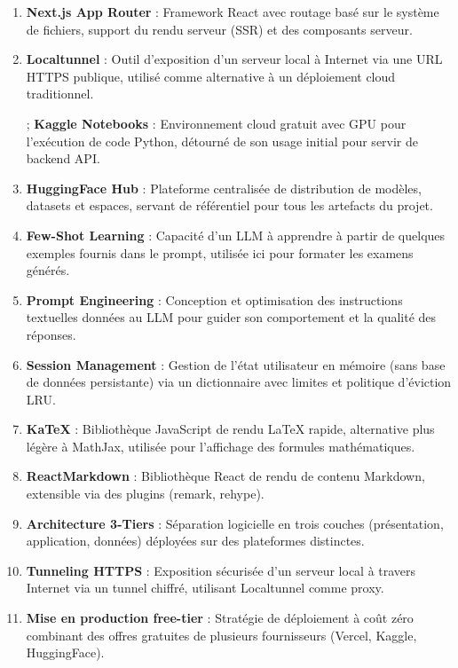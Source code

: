 \documentclass[12pt,a4paper]{report}
\begin{document}
\begin{enumerate}[label=\textbf{\arabic{.}}]
    \item \textbf{Next.js App Router} : Framework React avec routage basé sur le système de fichiers, support du rendu serveur (SSR) et des composants serveur.
    
    \item \textbf{Localtunnel} : Outil d'exposition d'un serveur local à Internet via une URL HTTPS publique, utilisé comme alternative à un déploiement cloud traditionnel.
    
    \ite; \textbf{Kaggle Notebooks} : Environnement cloud gratuit avec GPU pour l'exécution de code Python, détourné de son usage initial pour servir de backend API.
    
    \item \textbf{HuggingFace Hub} : Plateforme centralisée de distribution de modèles, datasets et espaces, servant de référentiel pour tous les artefacts du projet.
    
    \item \textbf{Few-Shot Learning} : Capacité d'un LLM à apprendre à partir de quelques exemples fournis dans le prompt, utilisée ici pour formater les examens générés.
    
    \item \textbf{Prompt Engineering} : Conception et optimisation des instructions textuelles données au LLM pour guider son comportement et la qualité des réponses.
    
    \item \textbf{Session Management} : Gestion de l'état utilisateur en mémoire (sans base de données persistante) via un dictionnaire avec limites et politique d'éviction LRU.
    
    \item \textbf{KaTeX} : Bibliothèque JavaScript de rendu LaTeX rapide, alternative plus légère à MathJax, utilisée pour l'affichage des formules mathématiques.
    
    \item \textbf{ReactMarkdown} : Bibliothèque React de rendu de contenu Markdown, extensible via des plugins (remark, rehype).
    
    \item \textbf{Architecture 3-Tiers} : Séparation logicielle en trois couches (présentation, application, données) déployées sur des plateformes distinctes.
    
    \item \textbf{Tunneling HTTPS} : Exposition sécurisée d'un serveur local à travers Internet via un tunnel chiffré, utilisant Localtunnel comme proxy.
    
    \item \textbf{Mise en production free-tier} : Stratégie de déploiement à coût zéro combinant des offres gratuites de plusieurs fournisseurs (Vercel, Kaggle, HuggingFace).
\end{enumerate}
\end{document}
